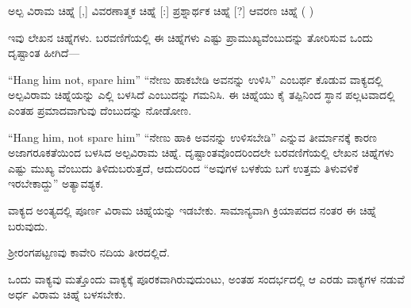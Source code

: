 \indent ಅಲ್ಪ ವಿರಾಮ ಚಿಹ್ನೆ {[},{]} ವಿವರಣಾತ್ಮಕ ಚಿಹ್ನೆ {[}:{]} ಪ್ರಶ್ನಾರ್ಥಕ ಚಿಹ್ನೆ {[}?{]} ಆವರಣ ಚಿಹ್ನೆ ( )\par

\indent ಇವು ಲೇಖನ ಚಿಹ್ನೆಗಳು. ಬರವಣಿಗೆಯಲ್ಲಿ ಈ ಚಿಹ್ನೆಗಳು ಎಷ್ಟು ಪ್ರಾಮುಖ್ಯವೆಂಬುದನ್ನು ತೋರಿಸುವ ಒಂದು ದೃಷ್ಟಾಂತ ಹೀಗಿದೆ—\par

\indent “{\kbvlatin Hang} {\kbvlatin him} {\kbvlatin not}, {\kbvlatin spare} {\kbvlatin him}” “ನೇಣು ಹಾಕಬೇಡಿ ಅವನನ್ನು ಉಳಿಸಿ” ಎಂಬರ್ಥ ಕೊಡುವ ವಾಕ್ಯದಲ್ಲಿ ಅಲ್ಪವಿರಾಮ ಚಿಹ್ನೆಯನ್ನು ಎಲ್ಲಿ ಬಳಸಿದೆ ಎಂಬುದನ್ನು ಗಮನಿಸಿ. ಈ ಚಿಹ್ನೆಯು ಕೈ ತಪ್ಪಿನಿಂದ ಸ್ಥಾನ ಪಲ್ಲಟವಾದಲ್ಲಿ ಎಂತಹ ಪ್ರಮಾದವಾಗುವು ದೆಂಬುದನ್ನು ನೋಡೋಣ.\par

\indent “{\kbvlatin Hang} {\kbvlatin him}, {\kbvlatin not} {\kbvlatin spare} {\kbvlatin him}” “ನೇಣು ಹಾಕಿ ಅವನನ್ನು ಉಳಿಸಬೇಡಿ” ಎನ್ನುವ ತೀರ್ಮಾನಕ್ಕೆ ಕಾರಣ ಅಜಾಗರೂಕತೆಯಿಂದ ಬಳಸಿದ ಅಲ್ಪವಿರಾಮ ಚಿಹ್ನೆ. ದೃಷ್ಟಾಂತವೊಂದರಿಂದಲೇ ಬರವಣಿಗೆಯಲ್ಲಿ ಲೇಖನ ಚಿಹ್ನೆಗಳು ಎಷ್ಟು ಮುಖ್ಯ ವೆಂಬುದು ತಿಳಿದುಬರುತ್ತದೆ, ಆದುದರಿಂದ “ಅವುಗಳ ಬಳಕೆಯ ಬಗೆ ಉತ್ತಮ ತಿಳುವಳಿಕೆ ಇರಬೇಕಾದ್ದು” ಅತ್ಯಾವಶ್ಯಕ.\par

\vspace{4pt plus 4pt minus 1pt}\hspace{0.5em}ವಾಕ್ಯದ ಅಂತ್ಯದಲ್ಲಿ ಪೂರ್ಣ ವಿರಾಮ ಚಿಹ್ನೆಯನ್ನು ಇಡಬೇಕು. ಸಾಮಾನ್ಯವಾಗಿ ಕ್ರಿಯಾಪದದ ನಂತರ ಈ ಚಿಹ್ನೆ ಬರುವುದು.\par

\noindent\hspace*{1.2em}\hspace{0.6em}ಶ್ರೀರಂಗಪಟ್ಟಣವು ಕಾವೇರಿ ನದಿಯ ತೀರದಲ್ಲಿದೆ.\par

\vspace{4pt plus 4pt minus 1pt}\hspace{0.5em}ಒಂದು ವಾಕ್ಯವು ಮತ್ತೊಂದು ವಾಕ್ಯಕ್ಕೆ ಪೂರಕವಾಗಿರುವುದುಂಟು, ಅಂತಹ ಸಂದರ್ಭದಲ್ಲಿ ಆ ಎರಡು ವಾಕ್ಯಗಳ ನಡುವೆ ಅರ್ಧ ವಿರಾಮ ಚಿಹ್ನೆ ಬಳಸಬೇಕು.\par

\begin{kbvderiv}
\vspace{4pt plus 3pt minus 1pt}
\vspace{4pt plus 3pt minus 1pt}
\end{kbvderiv}
